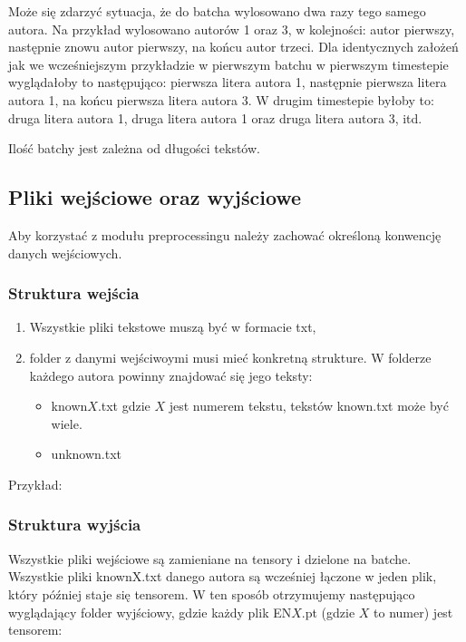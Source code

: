 Może się zdarzyć sytuacja, że do batcha wylosowano dwa razy tego samego autora. Na przykład wylosowano
autorów 1 oraz 3, w kolejności: autor pierwszy, następnie znowu autor pierwszy, na końcu autor trzeci.
Dla identycznych założeń jak we wcześniejszym przykładzie w pierwszym batchu w pierwszym timestepie wyglądałoby to
 następująco: pierwsza litera autora 1, następnie pierwsza litera autora 1,
na końcu pierwsza litera autora 3. W drugim timestepie byłoby to:
druga litera autora 1, druga litera autora 1 oraz druga litera autora 3, itd.

Ilość batchy jest zależna od długości tekstów. 

\newpage
\subsection{Pliki wejściowe oraz wyjściowe}
Aby korzystać z modułu preprocessingu należy zachować określoną konwencję danych wejściowych. 

\subsubsection{Struktura wejścia}

\begin{enumerate}
	\item Wszystkie pliki tekstowe muszą być w formacie txt,
	\item folder z danymi wejściwoymi musi mieć konkretną strukture. W folderze każdego autora
		  powinny znajdować się jego teksty: 
			\begin{itemize}
				\item known$X$.txt gdzie $X$ jest numerem tekstu, tekstów known.txt może być wiele.
				\item unknown.txt
			\end{itemize}
\end{enumerate}

Przykład: 

\myspace
{}
\myspace

\newpage
\subsubsection{Struktura wyjścia}

Wszystkie pliki wejściowe są zamieniane na tensory i dzielone na batche. Wszystkie pliki knownX.txt 
danego autora są wcześniej łączone w jeden plik, który później staje się tensorem. W ten sposób 
otrzymujemy następująco wyglądający folder wyjściowy, gdzie każdy plik EN$X$.pt (gdzie $X$ to numer)
 jest tensorem:

\myspace
{}
\myspace
